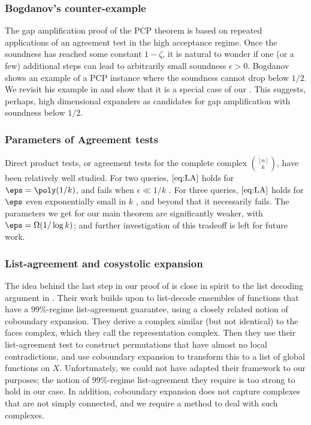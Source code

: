 \documentclass{article}[11pt]
\begin{document}
\subsubsection*{Bogdanov's counter-example}
The gap amplification proof of the PCP theorem \cite{Dinur07} is based on repeated applications of an agreement test in the high acceptance regime. Once the soundness has reached some constant $1-\zeta$, it is natural to wonder if one (or a few) additional steps can lead to arbitrarily small soundness $\epsilon>0$. Bogdanov shows \cite{Bogdanov-comment05} an example of a PCP instance where the soundness cannot drop below $1/2$. We revisit his example in  and show that it is a special case of our . This suggests, perhaps, high dimensional expanders as candidates for gap amplification with soundness below $1/2$. 


\subsubsection*{Parameters of Agreement tests}
Direct product tests, or agreement tests for the complete complex $\binom{[n]}{k}$, have been relatively well studied. For two queries, $\eqref{eq:LA}$ holds for $\eps = \poly(1/k)$, and fails when $\epsilon\ll 1/k$ \cite{DinurG2008}. For three queries, $\eqref{eq:LA}$ holds for $\eps$ even exponentially small in $k$ \cite{ImpagliazzoKW2012,DinurS14, DinurL2017}, and beyond that it necessarily fails. The parameters we get for our main theorem are significantly weaker, with $\eps = \Omega(1/\log k)$; and further investigation of this tradeoff is left for future work. 

\subsubsection*{List-agreement and cosystolic expansion}
The idea behind the last step in our proof of  is close in spirit to the list decoding argument in \cite{GotlibK2022}. Their work builds upon \cite{DinurM2019} to list-decode ensembles of functions that have a \(99\%\)-regime list-agreement guarantee, using a closely related notion of coboundary expansion. They derive a complex similar (but not identical) to the faces complex, which they call the representation complex. Then they use their list-agreement test to construct permutations that have almost no local contradictions, and use coboundary expansion to transform this to a list of global functions on \(X\). Unfortunately, we could not have adapted their framework to our purposes; the notion of \(99\%\)-regime list-agreement they require is too strong to hold in our case. In addition, coboundary expansion does not capture complexes that are not simply connected, and we require a method to deal with such complexes.
\end{document}
